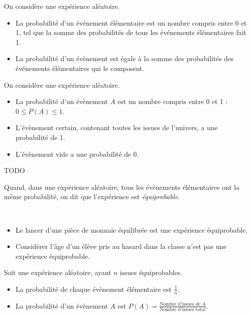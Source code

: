 \begin{definition} On considère une expérience aléatoire.
  \begin{itemize}
    \item La probabilité d'un événement élémentaire est un nombre compris entre 0 et 1, tel que la somme des probabilités de tous les événements élémentaires fait 1.
    \item La probabilité d'un évènement est égale à la somme des probabilités des événements élémentaires qui le composent.
  \end{itemize}
\end{definition}

\begin{propriete}On considère une expérience aléatoire.
  \begin{itemize}
    \item La probabilité d'un évènement $A$ est un nombre compris entre 0 et 1 : $0\leq P(A)\leq1$.
    \item L'évènement certain, contenant toutes les issues de l'univers, a une probabilité de 1.
    \item L'évènement vide a une probabilité de 0.
  \end{itemize}
\end{propriete}

\begin{exemple}
  TODO
\end{exemple}

\begin{definition}
  Quand, dans une expérience aléatoire, tous les événements élémentaires ont la même
  probabilité, on dit que l'expérience est \emph{équiprobable}.
\end{definition}
\begin{exemple}~
  \begin{itemize}
    \item Le lancer d'une pièce de monnaie équilibrée est une expérience équiprobable.
    \item Considèrer l'âge d'un élève pris au hasard dans la classe n'est pas une expérience équiprobable.
  \end{itemize}
\end{exemple}

\begin{propriete}
  Soit une expérience aléatoire, ayant $n$ issues équiprobables.
  \begin{itemize}
    \item La probabilité de chaque évènement élémentaire est $\frac{1}{n}$.
    \item La probabilité d'un évènement $A$ est $P(A)=\frac{\text{Nombre
      d'issues de $A$}}{\text{Nombre d'issues total}}$.
  \end{itemize}
\end{propriete}

